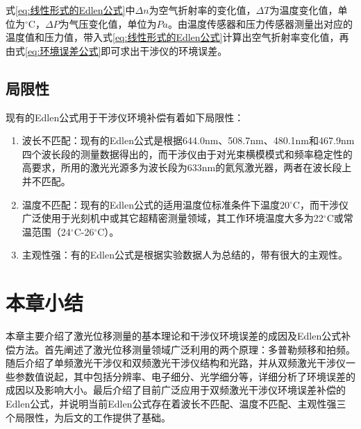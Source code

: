 式\eqref{eq:线性形式的Edlen公式}中\(\Delta n\)为空气折射率的变化值，\(\Delta T\)为温度变化值，单位为$^{\circ}$C，\(\Delta P\)为气压变化值，单位为\(Pa\)。由温度传感器和压力传感器测量出对应的温度值和压力值，带入式\eqref{eq:线性形式的Edlen公式}计算出空气折射率变化值，再由式\eqref{eq:环境误差公式}即可求出干涉仪的环境误差。
\subsection{局限性}
现有的Edlen公式用于干涉仪环境补偿有着如下局限性：
\begin{enumerate}
  \item 波长不匹配：现有的Edlen公式是根据644.0nm、508.7nm、480.1nm和467.9nm四个波长段的测量数据得出的，而干涉仪由于对光束横模模式和频率稳定性的高要求，所用的激光光源多为波长段为633nm的氦氖激光器，两者在波长段上并不匹配。
  \item 温度不匹配：现有的Edlen公式的适用温度位标准条件下温度20$^{\circ}$C\cite{2020Effect}，而干涉仪广泛使用于光刻机中或其它超精密测量领域，其工作环境温度大多为22$^{\circ}$C或常温范围（24$^{\circ}$C-26$^{\circ}$C）。
  \item 主观性强：有的Edlen公式是根据实验数据人为总结的，带有很大的主观性。
\end{enumerate}


\section{本章小结}
本章主要介绍了激光位移测量的基本理论和干涉仪环境误差的成因及Edlen公式补偿方法。首先阐述了激光位移测量领域广泛利用的两个原理：多普勒频移和拍频。随后介绍了单频激光干涉仪和双频激光干涉仪结构和光路，并从双频激光干涉仪一些参数值说起，其中包括分辨率、电子细分、光学细分等，详细分析了环境误差的成因以及影响大小。最后介绍了目前广泛应用于双频激光干涉仪环境误差补偿的Edlen公式，并说明当前Edlen公式存在着波长不匹配、温度不匹配、主观性强三个局限性，为后文的工作提供了基础。